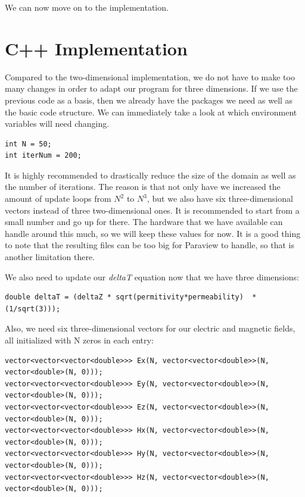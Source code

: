 We can now move on to the implementation.


\section{C++ Implementation}

Compared to the two-dimensional implementation, we do not have to make too many changes in order to adapt our program for three dimensions. If we use the previous code as a basis, then we already have the packages we need as well as the basic code structure. We can immediately take a look at which environment variables will need changing.

\begin{verbatim}
int N = 50;
int iterNum = 200;
\end{verbatim}

It is highly recommended to drastically reduce the size of the domain as well as the number of iterations. The reason is that not only have we increased the amount of update loops from $N^2$ to $N^3$, but we also have six three-dimensional vectors instead of three two-dimensional ones. It is recommended to start from a small number and go up for there. The hardware that we have available can handle around this much, so we will keep these values for now. It is a good thing to note that the resulting files can be too big for Paraview to handle, so that is another limitation there.

We also need to update our \textit{deltaT} equation now that we have three dimensions:

\begin{verbatim}
double deltaT = (deltaZ * sqrt(permitivity*permeability)  * (1/sqrt(3)));
\end{verbatim}

Also, we need six three-dimensional vectors for our electric and magnetic fields, all initialized with N zeros in each entry:

\begin{verbatim}
vector<vector<vector<double>>> Ex(N, vector<vector<double>>(N, vector<double>(N, 0)));
vector<vector<vector<double>>> Ey(N, vector<vector<double>>(N, vector<double>(N, 0)));
vector<vector<vector<double>>> Ez(N, vector<vector<double>>(N, vector<double>(N, 0)));
vector<vector<vector<double>>> Hx(N, vector<vector<double>>(N, vector<double>(N, 0)));
vector<vector<vector<double>>> Hy(N, vector<vector<double>>(N, vector<double>(N, 0)));
vector<vector<vector<double>>> Hz(N, vector<vector<double>>(N, vector<double>(N, 0)));
\end{verbatim}

